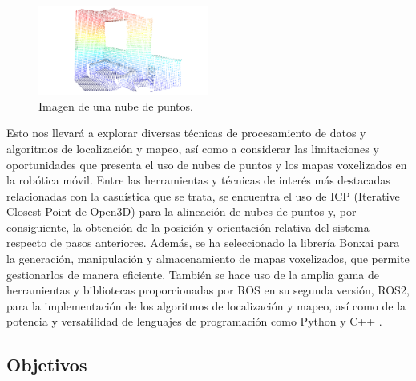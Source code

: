 \documentclass[12pt, a4paper, twoside]{article}
\begin{document}
\begin{figure}[h]
  \centering
    \includegraphics[width=0.5\textwidth]{Point_cloud_example.png}
  \caption{Imagen de una nube de puntos.}
\end{figure}
Esto nos llevará a explorar diversas técnicas de procesamiento de datos y algoritmos de localización y mapeo, así como a 
considerar las limitaciones y oportunidades que presenta el uso de nubes de puntos y los mapas voxelizados en la 
robótica móvil. \newline
Entre las herramientas y técnicas de interés más destacadas relacionadas con la casuística que se trata, se encuentra 
el uso de ICP (Iterative Closest Point de Open3D\cite{Zhou2018}) para la alineación de nubes de puntos y, por consiguiente, la 
obtención de la posición y orientación relativa del sistema respecto de pasos anteriores. Además, se ha seleccionado la librería 
Bonxai\cite{faconti2024bonxai} para la generación, manipulación y almacenamiento de mapas voxelizados, que permite gestionarlos de 
manera eficiente. También se hace uso de la amplia gama de herramientas y bibliotecas proporcionadas por ROS\cite{doi:10.1126/scirobotics.abm6074} 
en su segunda versión, ROS2\cite{doi:10.1126/scirobotics.abm6074}, para la implementación de los algoritmos de localización y mapeo, así como de la potencia y 
versatilidad de lenguajes de programación como Python\cite{python} y C++\cite{cpp} . \newline

\subsection{Objetivos}
\end{document}
